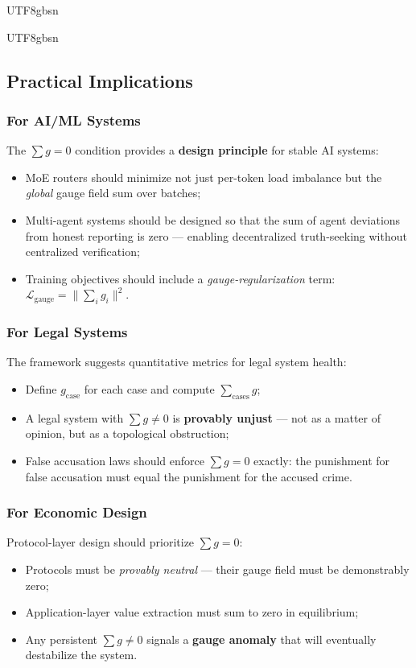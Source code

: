 \documentclass[11pt,a4paper]{article}
\begin{document}
\begin{CJK}{UTF8}{gbsn}
{\begin{CJK}{UTF8}{gbsn}
\subsection{Practical Implications}
\subsubsection{For AI/ML Systems}
The $\sum g = 0$ condition provides a \textbf{design principle} for stable AI systems:
\begin{itemize}
    \item MoE routers should minimize not just per-token load imbalance but
          the \textit{global} gauge field sum over batches;
    \item Multi-agent systems should be designed so that the sum of agent
          deviations from honest reporting is zero --- enabling decentralized
          truth-seeking without centralized verification;
    \item Training objectives should include a \textit{gauge-regularization} term:
          $\mathcal{L}_{\text{gauge}} = \|\sum_i g_i\|^2$.
\end{itemize}
\subsubsection{For Legal Systems}
The framework suggests quantitative metrics for legal system health:
\begin{itemize}
    \item Define $g_{\text{case}}$ for each case and compute $\sum_{\text{cases}} g$;
    \item A legal system with $\sum g \neq 0$ is \textbf{provably unjust} --- not
          as a matter of opinion, but as a topological obstruction;
    \item False accusation laws should enforce $\sum g = 0$ exactly: the punishment
          for false accusation must equal the punishment for the accused crime.
\end{itemize}
\subsubsection{For Economic Design}
Protocol-layer design should prioritize $\sum g = 0$:
\begin{itemize}
    \item Protocols must be \textit{provably neutral} --- their gauge field
          must be demonstrably zero;
    \item Application-layer value extraction must sum to zero in equilibrium;
    \item Any persistent $\sum g \neq 0$ signals a \textbf{gauge anomaly} that
          will eventually destabilize the system.
\end{itemize}

\end{CJK}}
\end{CJK}
\end{document}
